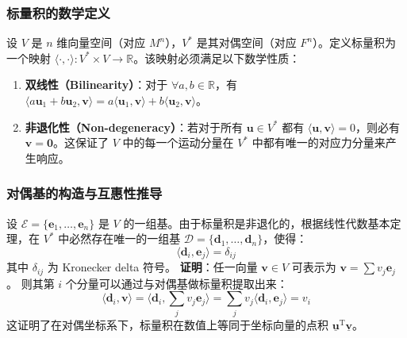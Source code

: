 \subsubsection{标量积的数学定义}
设 $V$ 是 $n$ 维向量空间（对应 $M^n$），$V^*$ 是其对偶空间（对应 $F^n$）。定义标量积为一个映射 $\langle \cdot, \cdot \rangle: V^* \times V \to \mathbb{R}$。该映射必须满足以下数学性质：
\begin{enumerate}
    \item \textbf{双线性（Bilinearity）}：对于 $\forall a, b \in \mathbb{R}$，有 $\langle a\boldsymbol{u}_1 + b\boldsymbol{u}_2, \boldsymbol{v} \rangle = a\langle \boldsymbol{u}_1, \boldsymbol{v} \rangle + b\langle \boldsymbol{u}_2, \boldsymbol{v} \rangle$。
    \item \textbf{非退化性（Non-degeneracy）}：若对于所有 $\boldsymbol{u} \in V^*$ 都有 $\langle \boldsymbol{u}, \boldsymbol{v} \rangle = 0$，则必有 $\boldsymbol{v} = \mathbf{0}$。这保证了 $V$ 中的每一个运动分量在 $V^*$ 中都有唯一的对应力分量来产生响应。
\end{enumerate}

\subsubsection{对偶基的构造与互惠性推导}
设 $\mathcal{E} = \{\boldsymbol{e}_1, \dots, \boldsymbol{e}_n\}$ 是 $V$ 的一组基。由于标量积是非退化的，根据线性代数基本定理，在 $V^*$ 中必然存在唯一的一组基 $\mathcal{D} = \{\boldsymbol{d}_1, \dots, \boldsymbol{d}_n\}$，使得：
\begin{equation}
\langle \boldsymbol{d}_i, \boldsymbol{e}_j \rangle = \delta_{ij}
\end{equation}
其中 $\delta_{ij}$ 为 Kronecker delta 符号。
\textbf{证明}：任一向量 $\boldsymbol{v} \in V$ 可表示为 $\boldsymbol{v} = \sum v_j \boldsymbol{e}_j$。
则其第 $i$ 个分量可以通过与对偶基做标量积提取出来：
\begin{equation}
\langle \boldsymbol{d}_i, \boldsymbol{v} \rangle = \langle \boldsymbol{d}_i, \sum_j v_j \boldsymbol{e}_j \rangle = \sum_j v_j \langle \boldsymbol{d}_i, \boldsymbol{e}_j \rangle = v_i
\end{equation}
这证明了在对偶坐标系下，标量积在数值上等同于坐标向量的点积 $\underline{\boldsymbol{u}}^{\text{T}} \underline{\boldsymbol{v}}$。

